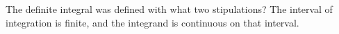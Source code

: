 {The definite integral was defined with what two stipulations?}
{The interval of integration is finite, and the integrand is continuous on that interval.}
